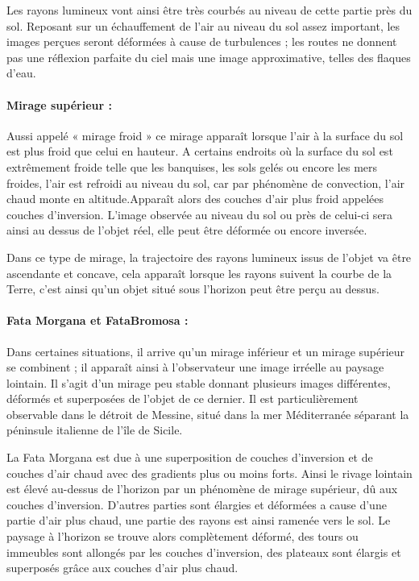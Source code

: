\documentclass[a4paper, 12pt, onecolumn, openany]{report}
\begin{document}
	Les rayons lumineux vont ainsi être très courbés au niveau de cette partie près du sol. Reposant sur un échauffement de l’air au niveau du sol assez important, les images perçues seront déformées à cause de turbulences ; les routes ne donnent pas une réflexion parfaite du ciel mais une image approximative, telles des flaques d’eau. 

\paragraph{Mirage supérieur :}
	Aussi appelé « mirage froid » ce mirage apparaît lorsque l’air à la surface du sol est plus froid que celui en hauteur.  A certains endroits où la surface du sol est extrêmement froide telle que les banquises, les sols gelés ou encore les mers froides, l’air est refroidi au niveau du sol, car par phénomène de convection, l’air chaud monte en altitude.Apparaît alors des couches d’air plus froid appelées couches d’inversion.  L’image observée au niveau du sol ou près de celui-ci sera ainsi au dessus de l’objet réel, elle peut être déformée ou encore inversée.
	
	Dans ce type de mirage, la trajectoire des rayons lumineux issus de l’objet va être ascendante et concave, cela apparaît lorsque les rayons suivent la courbe de la Terre, c’est ainsi qu’un objet situé sous l’horizon peut être perçu au dessus. 

\paragraph{Fata Morgana et FataBromosa :}
	Dans certaines situations, il arrive qu’un mirage inférieur et un mirage supérieur se combinent ; il apparaît ainsi à l’observateur une image irréelle au paysage lointain. 
	Il s’agit d’un mirage peu stable donnant plusieurs images différentes, déformés et superposées de l’objet de ce dernier. 
	Il est particulièrement observable dans le détroit de Messine, situé dans la mer Méditerranée séparant la péninsule italienne de l’île de Sicile. 
	
	La Fata Morgana est due à une superposition de couches d’inversion et de couches d’air chaud avec des gradients plus ou moins forts. Ainsi le rivage lointain est élevé au-dessus de l’horizon par un phénomène de mirage supérieur, dû aux couches d’inversion. D’autres parties sont élargies et déformées a cause d’une partie d’air plus chaud, une partie des rayons est ainsi ramenée vers le sol.  Le paysage à l’horizon se trouve alors complètement déformé, des tours ou immeubles sont allongés par les couches d’inversion, des plateaux sont élargis et superposés grâce aux couches d’air plus chaud. 
	
\end{document}
